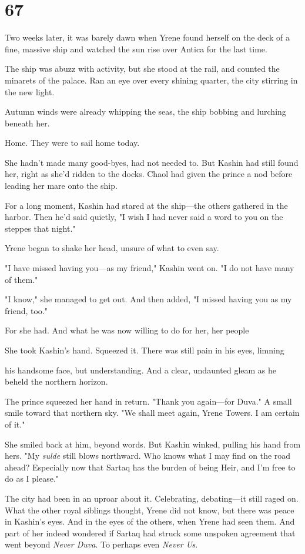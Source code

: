 
\chapter{67}

Two weeks later, it was barely dawn when Yrene found herself on the deck of a fine, massive ship and watched the sun rise over Antica for the last time.

The ship was abuzz with activity, but she stood at the rail, and counted the minarets of the palace. Ran an eye over every shining quarter, the city stirring in the new light.

Autumn winds were already whipping the seas, the ship bobbing and lurching beneath her.

Home. They were to sail home today.

She hadn't made many good-byes, had not needed to. But Kashin had still found her, right as she'd ridden to the docks. Chaol had given the prince a nod before leading her mare onto the ship.

For a long moment, Kashin had stared at the ship---the others gathered in the harbor. Then he'd said quietly, "I wish I had never said a word to you on the steppes that night."

Yrene began to shake her head, unsure of what to even say.

"I have missed having you---as my friend," Kashin went on. "I do not have many of them."

"I know," she managed to get out. And then added, "I missed having you as my friend, too."

For she had. And what he was now willing to do for her, her people


She took Kashin's hand. Squeezed it. There was still pain in his eyes, limning

his handsome face, but  understanding. And a clear, undaunted gleam as he beheld the northern horizon.

The prince squeezed her hand in return. "Thank you again---for Duva." A small smile toward that northern sky. "We shall meet again, Yrene Towers. I am certain of it."

She smiled back at him, beyond words. But Kashin winked, pulling his hand from hers. "My \emph{sulde} still blows northward. Who knows what I may find on the road ahead? Especially now that Sartaq has the burden of being Heir, and I'm free to do as I please."

The city had been in an uproar about it. Celebrating, debating---it still raged on. What the other royal siblings thought, Yrene did not know, but  there was peace in Kashin's eyes. And in the eyes of the others, when Yrene had seen them. And part of her indeed wondered if Sartaq had struck some unspoken agreement that went beyond \emph{Never Duva}. To perhaps even \emph{Never Us}.

